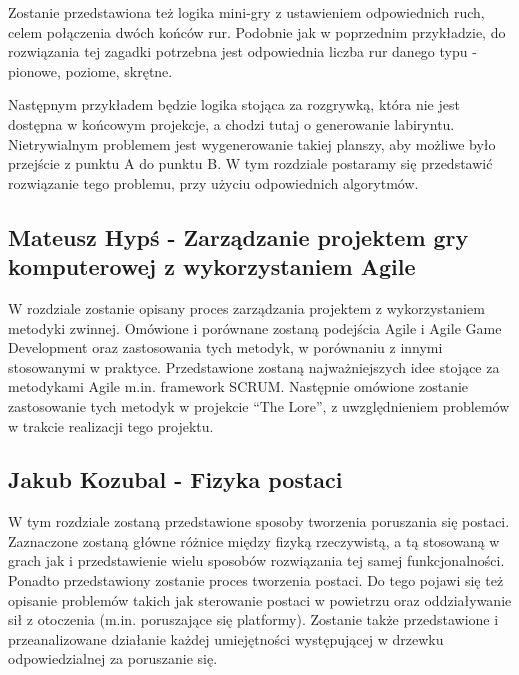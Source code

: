 \documentclass[oneside,polski,logo]{amuthesis}
\begin{document}
Zostanie przedstawiona też logika mini-gry z ustawieniem odpowiednich ruch, celem połączenia dwóch końców rur. Podobnie jak w poprzednim przykładzie, do rozwiązania tej zagadki potrzebna jest odpowiednia liczba rur danego typu - pionowe, poziome, skrętne. 

Następnym przykładem będzie logika stojąca za rozgrywką, która nie jest dostępna w końcowym projekcje, a chodzi tutaj o generowanie labiryntu. Nietrywialnym problemem jest wygenerowanie takiej planszy, aby możliwe było przejście z punktu A do punktu B. W tym rozdziale postaramy się przedstawić rozwiązanie tego problemu, przy użyciu odpowiednich algorytmów.

\subsection{Mateusz Hypś - Zarządzanie projektem gry komputerowej z wykorzystaniem Agile}
W rozdziale zostanie opisany proces zarządzania projektem z wykorzystaniem metodyki zwinnej. Omówione i porównane zostaną podejścia Agile i Agile Game Development oraz zastosowania tych metodyk, w porównaniu z innymi stosowanymi w praktyce. Przedstawione zostaną najważniejszych idee stojące za metodykami Agile m.in. framework SCRUM. Następnie omówione zostanie zastosowanie tych metodyk w projekcie “The Lore”, z uwzględnieniem problemów w trakcie realizacji tego projektu. 
\subsection{Jakub Kozubal - Fizyka postaci}
W tym rozdziale zostaną przedstawione sposoby tworzenia poruszania się postaci. Zaznaczone zostaną główne różnice między fizyką rzeczywistą, a tą stosowaną w grach jak i przedstawienie wielu sposobów rozwiązania tej samej funkcjonalności. Ponadto przedstawiony zostanie proces tworzenia postaci. Do tego pojawi się też opisanie problemów takich jak sterowanie postaci w powietrzu oraz oddziaływanie sił z otoczenia (m.in. poruszające się platformy). Zostanie także przedstawione i przeanalizowane działanie każdej umiejętności występującej w drzewku odpowiedzialnej za poruszanie się.
\end{document}
